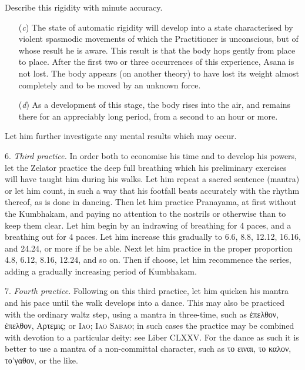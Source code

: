 Describe this rigidity with minute accuracy.

\begin{enumerate}
\item[(\textit{c})] The state of automatic rigidity will develop into a state characterised by violent spasmodic movements of which the Practitioner is unconscious, but of whose result he is aware. This result is that the body hops gently from place to place. After the first two or three occurrences of this experience, Asana is not lost. The body appears (on another theory) to have lost its weight almost completely and to be moved by an unknown force.
\item[(\textit{d})] As a development of this stage, the body rises into the air, and remains there for an appreciably long period, from a second to an hour or more.
\end{enumerate}
Let him further investigate any mental results which may occur.

6. \textit{Third practice.} In order both to economise his time and to develop his powers, let the Zelator practice the deep full breathing which his preliminary exercises will have taught him during his walks. Let him repeat a sacred sentence (mantra) or let him count, in such a way that his footfall beats accurately with the rhythm thereof, as is done in dancing. Then let him practice Pranayama, at first without the Kumbhakam, and paying no attention to the nostrils or otherwise than to keep them clear. Let him begin by an indrawing of breathing for 4 paces, and a breathing out for 4 paces. Let him increase this gradually to 6.6, 8.8, 12.12, 16.16, and 24.24, or more if he be able. Next let him practice in the proper proportion 4.8, 6.12, 8.16, 12.24, and so on. Then if choose, let him recommence the series, adding a gradually increasing period of Kumbhakam.

7. \textit{Fourth practice.} Following on this third practice, let him quicken his mantra and his pace until the walk develops into a dance. This may also be practiced with the ordinary waltz step, using a mantra in three-time, such as \'{ε}πελθον, \'{ε}πελθον, Αρτεμις; or \textsc{Iao; Iao Sabao}; in such cases the practice may be combined with devotion to a particular deity: see Liber CLXXV. For the dance as such it is better to use a mantra of a non-committal character, such as το ειναι, το καλον, το’γαθον, or the like.


